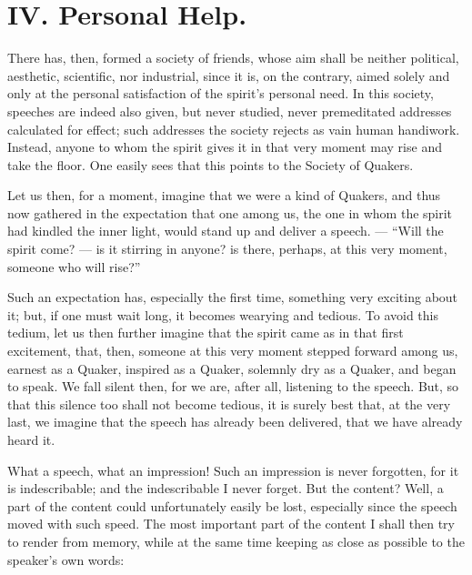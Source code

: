 \documentclass[12pt,a4paper]{book}
\begin{document}
\chapter*{IV. Personal Help.}
\label{ch:forel4}

There has, then, formed a society of friends, whose aim shall be neither political, aesthetic, scientific, nor industrial, since it is, on the contrary, aimed solely and only at the personal satisfaction of the spirit's personal need. In this society, speeches are indeed also given, but never studied, never premeditated addresses calculated for effect; such addresses the society rejects as vain human handiwork. Instead, anyone to whom the spirit gives it in that very moment may rise and take the floor. One easily sees that this points to the Society of Quakers.

Let us then, for a moment, imagine that we were a kind of Quakers, and thus now gathered in the expectation that one among us, the one in whom the spirit had kindled the inner light, would stand up and deliver a speech. --- ``Will the spirit come? --- is it stirring in anyone? is there, perhaps, at this very moment, someone who will rise?''

Such an expectation has, especially the first time, something very exciting about it; but, if one must wait long, it becomes wearying and tedious. To avoid this tedium, let us then further imagine that the spirit came as in that first excitement, that, then, someone at this very moment stepped forward among us, earnest as a Quaker, inspired as a Quaker,
solemnly dry as a Quaker, and began to speak. We fall silent then, for we are, after all, listening to the speech. But, so that this silence too shall not become tedious, it is surely best that, at the very last, we imagine that the speech has already been delivered, that we have already heard it.

What a speech, what an impression! Such an impression is never forgotten, for it is indescribable; and the indescribable I never forget. But the content? Well, a part of the content could unfortunately easily be lost, especially since the speech moved with such speed. The most important part of the content I shall then try to render from memory, while at the same time keeping as close as possible to the speaker's own words:
\end{document}
